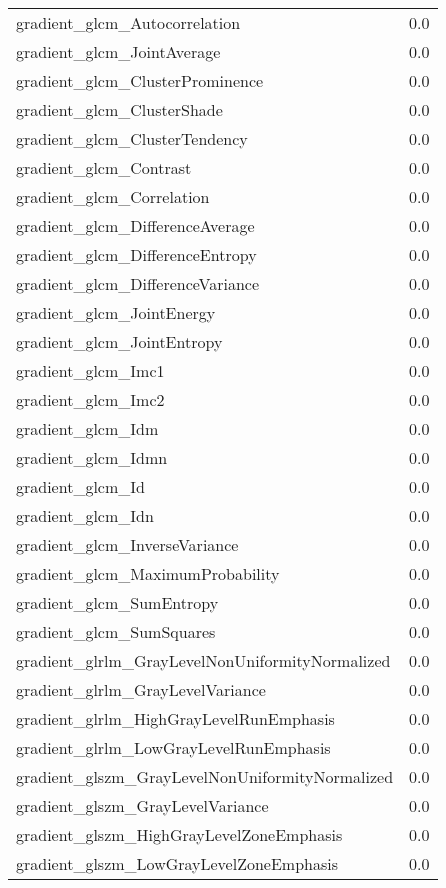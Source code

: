 {\begin{xltabular}[H]{\textwidth}{X r}
        gradient\_glcm\_Autocorrelation & 0.0 \\
        gradient\_glcm\_JointAverage & 0.0 \\
        gradient\_glcm\_ClusterProminence & 0.0 \\
        gradient\_glcm\_ClusterShade & 0.0 \\
        gradient\_glcm\_ClusterTendency & 0.0 \\
        gradient\_glcm\_Contrast & 0.0 \\
        gradient\_glcm\_Correlation & 0.0 \\
        gradient\_glcm\_DifferenceAverage & 0.0 \\
        gradient\_glcm\_DifferenceEntropy & 0.0 \\
        gradient\_glcm\_DifferenceVariance & 0.0 \\
        gradient\_glcm\_JointEnergy & 0.0 \\
        gradient\_glcm\_JointEntropy & 0.0 \\
        gradient\_glcm\_Imc1 & 0.0 \\
        gradient\_glcm\_Imc2 & 0.0 \\
        gradient\_glcm\_Idm & 0.0 \\
        gradient\_glcm\_Idmn & 0.0 \\
        gradient\_glcm\_Id & 0.0 \\
        gradient\_glcm\_Idn & 0.0 \\
        gradient\_glcm\_InverseVariance & 0.0 \\
        gradient\_glcm\_MaximumProbability & 0.0 \\
        gradient\_glcm\_SumEntropy & 0.0 \\
        gradient\_glcm\_SumSquares & 0.0 \\
        gradient\_glrlm\_GrayLevelNonUniformityNormalized & 0.0 \\
        gradient\_glrlm\_GrayLevelVariance & 0.0 \\
        gradient\_glrlm\_HighGrayLevelRunEmphasis & 0.0 \\
        gradient\_glrlm\_LowGrayLevelRunEmphasis & 0.0 \\
        gradient\_glszm\_GrayLevelNonUniformityNormalized & 0.0 \\
        gradient\_glszm\_GrayLevelVariance & 0.0 \\
        gradient\_glszm\_HighGrayLevelZoneEmphasis & 0.0 \\
        gradient\_glszm\_LowGrayLevelZoneEmphasis & 0.0 \\

\end{xltabular}}
